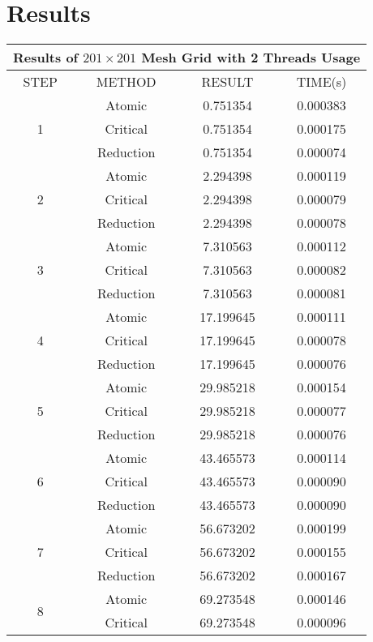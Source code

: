 \documentclass[10pt]{article}
\begin{document}
\section{Results}
\begin{center}
\begin{tabular}{|c|c|c|c|}
\hline
\multicolumn{4}{|c|}{Results of $201 \times 201$ Mesh Grid with 2 Threads Usage} \\
\hline
STEP & METHOD & RESULT & TIME(s) \\
\hline
\multirow[t]{3}{*}{1} & Atomic & 0.751354 & 0.000383 \\
\hline
 & Critical & 0.751354 & 0.000175 \\
\hline
 & Reduction & 0.751354 & 0.000074 \\
\hline
\multirow[t]{3}{*}{2} & Atomic & 2.294398 & 0.000119 \\
\hline
 & Critical & 2.294398 & 0.000079 \\
\hline
 & Reduction & 2.294398 & 0.000078 \\
\hline
\multirow[t]{3}{*}{3} & Atomic & 7.310563 & 0.000112 \\
\hline
 & Critical & 7.310563 & 0.000082 \\
\hline
 & Reduction & 7.310563 & 0.000081 \\
\hline
\multirow[t]{3}{*}{4} & Atomic & 17.199645 & 0.000111 \\
\hline
 & Critical & 17.199645 & 0.000078 \\
\hline
 & Reduction & 17.199645 & 0.000076 \\
\hline
\multirow[t]{3}{*}{5} & Atomic & 29.985218 & 0.000154 \\
\hline
 & Critical & 29.985218 & 0.000077 \\
\hline
 & Reduction & 29.985218 & 0.000076 \\
\hline
\multirow[t]{3}{*}{6} & Atomic & 43.465573 & 0.000114 \\
\hline
 & Critical & 43.465573 & 0.000090 \\
\hline
 & Reduction & 43.465573 & 0.000090 \\
\hline
\multirow[t]{3}{*}{7} & Atomic & 56.673202 & 0.000199 \\
\hline
 & Critical & 56.673202 & 0.000155 \\
\hline
 & Reduction & 56.673202 & 0.000167 \\
\hline
\multirow[t]{3}{*}{8} & Atomic & 69.273548 & 0.000146 \\
\hline
 & Critical & 69.273548 & 0.000096 \\

\end{tabular}
\end{center}
\end{document}
